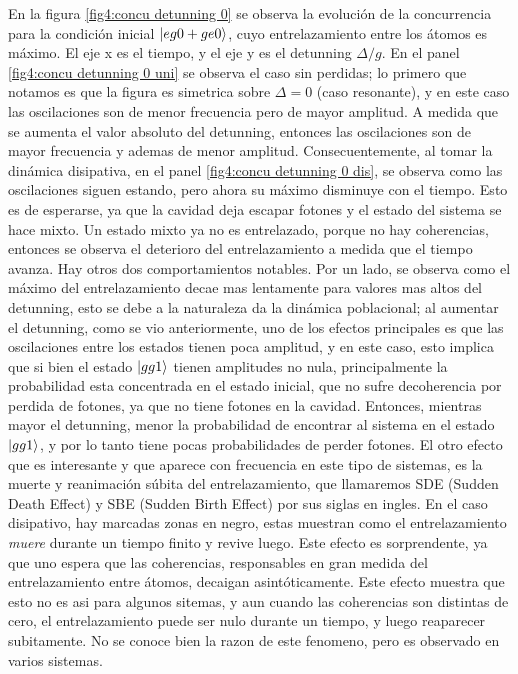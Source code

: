 En la figura \ref{fig4:concu detunning 0} se observa la evolución de la concurrencia para la condición inicial $\ket{eg0+ge0}$, cuyo entrelazamiento entre los átomos es máximo. El eje x es el tiempo, y el eje y es el detunning $\Delta/g$. En el panel \ref{fig4:concu detunning 0 uni} se observa el caso sin perdidas; lo primero que notamos es que la figura es simetrica sobre $\Delta=0$ (caso resonante), y en este caso las oscilaciones son de menor frecuencia pero de mayor amplitud. A medida que se aumenta el valor absoluto del detunning, entonces las oscilaciones son de mayor frecuencia y ademas de menor amplitud. Consecuentemente, al tomar la dinámica disipativa, en el panel \ref{fig4:concu detunning 0 dis}, se observa como las oscilaciones siguen estando, pero ahora su máximo disminuye con el tiempo. Esto es de esperarse, ya que la cavidad deja escapar fotones y el estado del sistema se hace mixto. Un estado mixto ya no es entrelazado, porque no hay coherencias, entonces se observa el deterioro del entrelazamiento a medida que el tiempo avanza. Hay otros dos comportamientos notables. Por un lado, se observa como el máximo del entrelazamiento decae mas lentamente para valores mas altos del detunning, esto se debe a la naturaleza da la dinámica poblacional; al aumentar el detunning, como se vio anteriormente, uno de los efectos principales es que las oscilaciones entre los estados tienen poca amplitud, y en este caso, esto implica que si bien el estado $\ket{gg1}$ tienen amplitudes no nula, principalmente la probabilidad esta concentrada en el estado inicial, que no sufre decoherencia por perdida de fotones, ya que no tiene fotones en la cavidad. Entonces, mientras mayor el detunning, menor la probabilidad de encontrar al sistema en el estado $\ket{gg1}$, y por lo tanto tiene pocas probabilidades de perder fotones. El otro efecto que es interesante y que aparece con frecuencia en este tipo de sistemas, es la muerte y reanimación súbita del entrelazamiento, que llamaremos SDE (Sudden Death Effect) y SBE (Sudden Birth Effect) por sus siglas en ingles. En el caso disipativo, hay marcadas zonas en negro, estas muestran como el entrelazamiento \textit{muere} durante un tiempo finito y revive luego. Este efecto es sorprendente, ya que uno espera que las coherencias, responsables en gran medida del entrelazamiento entre átomos, decaigan asintóticamente. Este efecto muestra que esto no es asi para algunos sitemas, y aun cuando las coherencias son distintas de cero, el entrelazamiento puede ser nulo durante un tiempo, y luego reaparecer subitamente. No se conoce bien la razon de este fenomeno, pero es observado en varios sistemas. 

